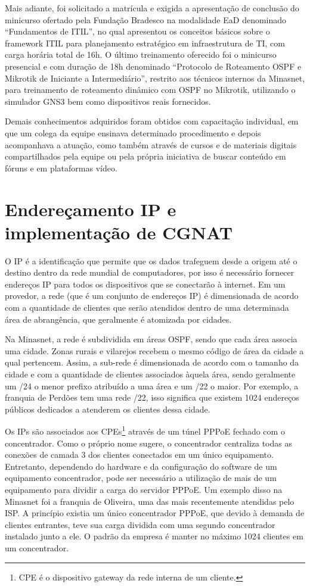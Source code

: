     Mais adiante, foi solicitado a matrícula e exigida a apresentação de conclusão do minicurso ofertado pela Fundação Bradesco na modalidade EaD denominado ``Fundamentos de ITIL'', no qual apresentou os conceitos básicos sobre o framework ITIL para planejamento estratégico em infraestrutura de TI, com carga horária total de 16h. O último treinamento oferecido foi o minicurso presencial e com duração de 18h denominado ``Protocolo de Roteamento OSPF e Mikrotik de Iniciante a Intermediário'', restrito aos técnicos internos da Minasnet, para treinamento de roteamento dinâmico com OSPF no Mikrotik, utilizando o simulador GNS3 bem como dispositivos reais fornecidos.
    
    Demais conhecimentos adquiridos foram obtidos com capacitação individual, em que um colega da equipe ensinava determinado procedimento e depois acompanhava a atuação, como também através de cursos e de materiais digitais compartilhados pela equipe ou pela própria iniciativa de buscar conteúdo em fóruns e em plataformas vídeo.
    
\section{Endereçamento IP e implementação de CGNAT}

    O IP é a identificação que permite que os dados trafeguem desde a origem até o destino dentro da rede mundial de computadores, por isso é necessário fornecer endereços IP para todos os dispositivos que se conectarão à internet. Em um provedor, a rede (que é um conjunto de endereços IP) é dimensionada de acordo com a quantidade de clientes que serão atendidos dentro de uma determinada área de abrangência, que geralmente é atomizada por cidades.
    
    Na Minasnet, a rede é subdividida em áreas OSPF, sendo que cada área associa uma cidade. Zonas rurais e vilarejos recebem o mesmo código de área da cidade a qual pertencem. Assim, a sub-rede é dimensionada de acordo com o tamanho da cidade e com a quantidade de clientes associados àquela área, sendo geralmente um /24 o menor prefixo atribuído a uma área e um /22 o maior. Por exemplo, a franquia de Perdões tem uma rede /22, isso significa que existem 1024 endereços públicos dedicados a atenderem os clientes dessa cidade.
    
   Os IPs são associados aos CPEs\footnote{CPE é o dispositivo gateway da rede interna de um cliente.} através de um túnel PPPoE fechado com o concentrador. Como o próprio nome sugere, o concentrador centraliza todas as conexões de camada 3 dos clientes conectados em um único equipamento. Entretanto, dependendo do hardware e da configuração do software de um equipamento concentrador, pode ser necessário a utilização de mais de um equipamento para dividir a carga do servidor PPPoE. 
   Um exemplo disso na Minasnet foi a franquia de Oliveira, uma das mais recentemente atendidas pelo ISP. A princípio existia um único concentrador PPPoE, que devido à demanda de clientes entrantes, teve sua carga dividida com uma segundo concentrador instalado junto a ele. O padrão da empresa é manter no máximo 1024 clientes em um concentrador.
   
